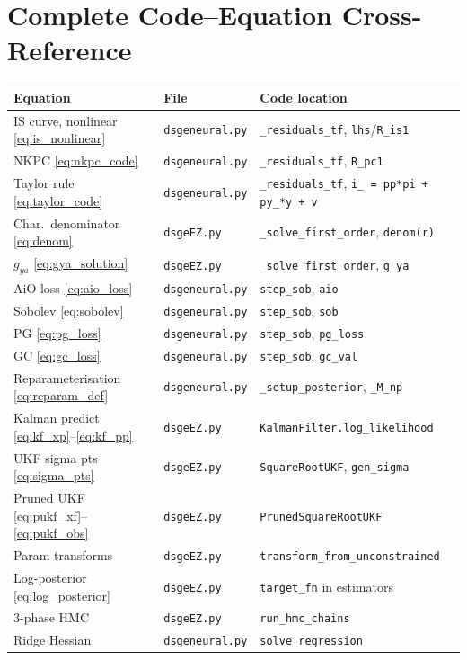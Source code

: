 \documentclass[11pt,a4paper]{article}
\theoremstyle{definition}
\newcommand{\code}[1]{\texttt{\color{codecolor}#1}}
\begin{document}
	
	\section{Complete Code--Equation Cross-Reference}
	\label{sec:crossref}
	
	\begin{center}
		\small
		\begin{tabular}{lll}
			\toprule
			\textbf{Equation} & \textbf{File} & \textbf{Code location} \\
			\midrule
			IS curve, nonlinear \eqref{eq:is_nonlinear} & \code{dsgeneural.py} & \code{\_residuals\_tf}, \code{lhs}/\code{R\_is1} \\
			NKPC \eqref{eq:nkpc_code} & \code{dsgeneural.py} & \code{\_residuals\_tf}, \code{R\_pc1} \\
			Taylor rule \eqref{eq:taylor_code} & \code{dsgeneural.py} & \code{\_residuals\_tf}, \code{i\_ = pp*pi + py\_*y + v} \\
			Char.\ denominator \eqref{eq:denom} & \code{dsgeEZ.py} & \code{\_solve\_first\_order}, \code{denom(r)} \\
			$g_{ya}$ \eqref{eq:gya_solution} & \code{dsgeEZ.py} & \code{\_solve\_first\_order}, \code{g\_ya} \\
			AiO loss \eqref{eq:aio_loss} & \code{dsgeneural.py} & \code{step\_sob}, \code{aio} \\
			Sobolev \eqref{eq:sobolev} & \code{dsgeneural.py} & \code{step\_sob}, \code{sob} \\
			PG \eqref{eq:pg_loss} & \code{dsgeneural.py} & \code{step\_sob}, \code{pg\_loss} \\
			GC \eqref{eq:gc_loss} & \code{dsgeneural.py} & \code{step\_sob}, \code{gc\_val} \\
			Reparameterisation \eqref{eq:reparam_def} & \code{dsgeneural.py} & \code{\_setup\_posterior}, \code{\_M\_np} \\
			Kalman predict \eqref{eq:kf_xp}--\eqref{eq:kf_pp} & \code{dsgeEZ.py} & \code{KalmanFilter.log\_likelihood} \\
			UKF sigma pts \eqref{eq:sigma_pts} & \code{dsgeEZ.py} & \code{SquareRootUKF}, \code{gen\_sigma} \\
			Pruned UKF \eqref{eq:pukf_xf}--\eqref{eq:pukf_obs} & \code{dsgeEZ.py} & \code{PrunedSquareRootUKF} \\
			Param transforms & \code{dsgeEZ.py} & \code{transform\_from\_unconstrained} \\
			Log-posterior \eqref{eq:log_posterior} & \code{dsgeEZ.py} & \code{target\_fn} in estimators \\
			3-phase HMC & \code{dsgeEZ.py} & \code{run\_hmc\_chains} \\
			Ridge Hessian & \code{dsgeneural.py} & \code{solve\_regression} \\
			\bottomrule
		\end{tabular}
	\end{center}
	
\end{document}
